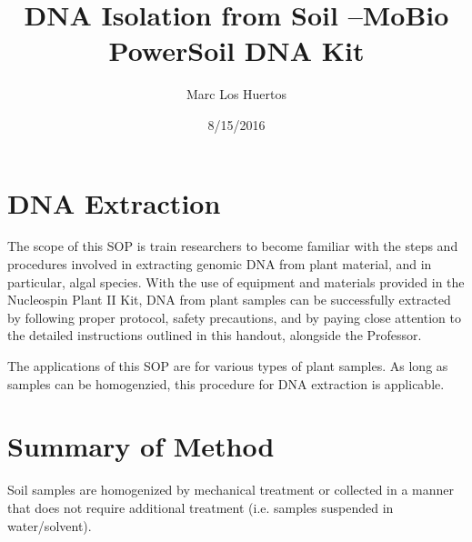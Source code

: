 \documentclass[12pt]{../SOP3_alpha}
\title{DNA Isolation from Soil --MoBio PowerSoil DNA Kit}
\date{8/15/2016}
\author{Marc Los Huertos}
\begin{document}


\maketitle

\section{DNA Extraction }

\NP The scope of this SOP is train researchers to become familiar with the steps and procedures involved in extracting genomic DNA from plant material, and in particular, algal species. With the use of equipment and materials provided in the Nucleospin Plant II Kit, DNA from plant samples can be successfully extracted by following proper protocol, safety precautions, and by paying close attention to the detailed instructions outlined in this handout, alongside the Professor. 

\NP The applications of this SOP are for various types of plant samples. As long as samples can be homogenzied, this procedure for DNA extraction is applicable. 

\section{Summary of Method}

Soil samples are homogenized by mechanical treatment or collected in a manner that does not require additional treatment (i.e. samples suspended in water/solvent). 

\end{document}
